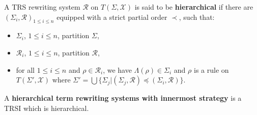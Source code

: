     \begin{definition}
      A TRS rewriting system $\mathcal{R}$ on $T(\Sigma, \mathcal{X})$ is said to be \textbf{hierarchical} if there are $(\Sigma_i, \mathcal{R})_{1 \leq i \leq n}$ equipped with a strict partial order $\prec$, such that:
      \begin{itemize}
        \item $\Sigma_i$, $1 \leq i \leq n$, partition $\Sigma$,
        \item $\mathcal{R}_i$, $1 \leq i \leq n$, partition $\mathcal{R}$,
        \item for all $1 \leq i \leq n$ and $\rho \mathop{\in} \mathcal{R}_i$, we have $\Lambda(\rho) \mathop{\in} \Sigma_i$ and $\rho$ is a rule on $T(\Sigma', \mathcal{X})$ where 
        $\Sigma' \mathop{=} \bigcup \{ \Sigma_j | (\Sigma_j, \mathcal{R}) \mathop{\preceq} (\Sigma_i, \mathcal{R}) \}$.
      \end{itemize}
    \end{definition}
  
    \begin{definition}
       A \textbf{hierarchical term rewriting systems with innermost strategy} is a TRSI which is hierarchical.
    \end{definition}
  
  

